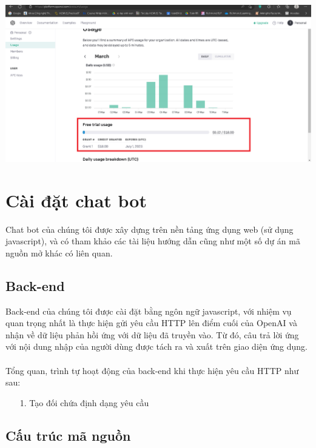 \documentclass[a4paper, 12pt]{article}
\begin{document}
\begin{itemize}
\begin{centering}
		\includegraphics[width = 170mm]{4.5.png}
	\end{centering}
	\end{itemize}
	
	\section{Cài đặt chat bot}
	Chat bot của chúng tôi được xây dựng trên nền tảng ứng dụng web (sử dụng javascript), và có tham khảo các tài liệu hướng dẫn cũng như một số dự án mã nguồn mở khác có liên quan.
	\subsection{Back-end}
	Back-end của chúng tôi được cài đặt bằng ngôn ngữ javascript, với nhiệm vụ quan trọng nhất là thực hiện gửi yêu cầu HTTP lên điểm cuối của OpenAI và nhận về dữ liệu phản hồi ứng với dữ liệu đã truyền vào. Từ đó, câu trả lời ứng với nội dung nhập của người dùng được tách ra và xuất trên giao diện ứng dụng.
	\\
	\\
	Tổng quan, trình tự hoạt động của back-end khi thực hiện yêu cầu HTTP như sau:
	\begin{itemize}
		\item[1.] Tạo đối chứa định dạng yêu cầu
	\end{itemize}
	
	
	\subsection{Cấu trúc mã nguồn}
	
	
\end{document}
